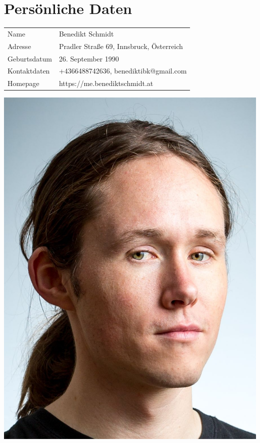 

	
	\section*{Persönliche Daten}
	\begin{minipage}[t]{13cm}
		\begin{tabularx}{\textwidth}{b{4cm}|l}
			Name & Benedikt Schmidt \\
			Adresse & Pradler Straße 69, Innsbruck, Österreich \\
			Geburtsdatum & 26. September 1990 \\
			Kontaktdaten & +4366488742636, benediktibk@gmail.com \\
			Homepage & https://me.benediktschmidt.at
		\end{tabularx}
	\end{minipage}
	\begin{minipage}[c]{2.5cm}
		\includegraphics[width=\textwidth]{portrait.jpg}
	\end{minipage}


